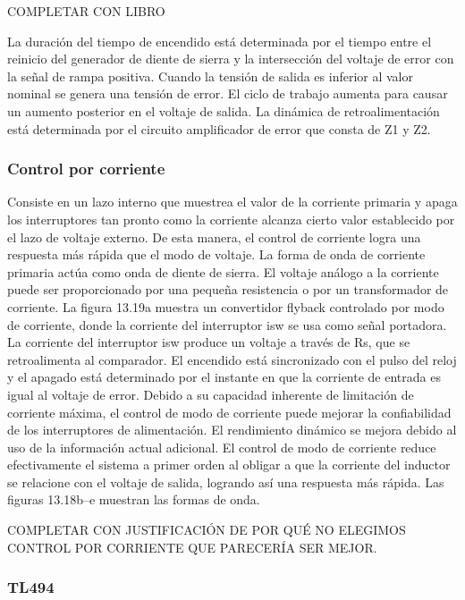 COMPLETAR CON LIBRO

La duración del tiempo de encendido está determinada por el tiempo entre el reinicio del generador de diente de sierra
y la intersección del voltaje de error con la señal de rampa positiva. 
Cuando la tensión de salida es inferior al valor nominal se genera una tensión de error. 
El ciclo de trabajo aumenta para causar un aumento posterior en el voltaje de salida. 
La dinámica de retroalimentación está determinada por el circuito amplificador de error que consta de Z1 y Z2.

\subsubsection{Control por corriente}

Consiste en un lazo interno que muestrea el valor de la corriente primaria y apaga los interruptores tan pronto como la corriente alcanza cierto valor establecido por el lazo de voltaje externo. 
De esta manera, el control de corriente logra una respuesta más rápida que el modo de voltaje. 
La forma de onda de corriente primaria actúa como onda de diente de sierra. 
El voltaje análogo a la corriente puede ser proporcionado por una pequeña resistencia o por un transformador de corriente. 
La figura 13.19a muestra un convertidor flyback controlado por modo de corriente, donde la corriente del interruptor isw se usa como señal portadora. 
La corriente del interruptor isw produce un voltaje a través de Rs, que se retroalimenta al comparador. 
El encendido está sincronizado con el pulso del reloj y el apagado está determinado por el instante en que la corriente de entrada es igual al voltaje de error.
Debido a su capacidad inherente de limitación de corriente máxima, el control de modo de corriente puede mejorar la confiabilidad de los interruptores de alimentación. El rendimiento dinámico se mejora debido al uso de la información actual adicional. El control de modo de corriente reduce efectivamente el sistema a primer orden al obligar a que la corriente del inductor se relacione con el voltaje de salida, logrando así una respuesta más rápida. Las figuras 13.18b–e muestran las formas de onda.

COMPLETAR CON JUSTIFICACIÓN DE POR QUÉ NO ELEGIMOS CONTROL POR CORRIENTE QUE PARECERÍA SER MEJOR. 

\subsubsection{TL494}

